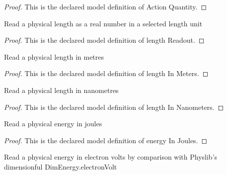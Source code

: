 \begin{proof}
  This is the declared model definition of Action Quantity.
\end{proof}
\begin{definition}
  \label{def:physics:phyx-mini-0533:phyxminiproblems-problemphyxmini0533-lengthreadout}
  Read a physical length as a real number in a selected length unit
\end{definition}
\begin{proof}
  This is the declared model definition of length Readout.
\end{proof}
\begin{definition}
  \label{def:physics:phyx-mini-0533:phyxminiproblems-problemphyxmini0533-lengthinmeters}
  Read a physical length in metres
\end{definition}
\begin{proof}
  This is the declared model definition of length In Meters.
\end{proof}
\begin{definition}
  \label{def:physics:phyx-mini-0533:phyxminiproblems-problemphyxmini0533-lengthinnanometers}
  Read a physical length in nanometres
\end{definition}
\begin{proof}
  This is the declared model definition of length In Nanometers.
\end{proof}
\begin{definition}
  \label{def:physics:phyx-mini-0533:phyxminiproblems-problemphyxmini0533-energyinjoules}
  Read a physical energy in joules
\end{definition}
\begin{proof}
  This is the declared model definition of energy In Joules.
\end{proof}
\begin{definition}
  \label{def:physics:phyx-mini-0533:phyxminiproblems-problemphyxmini0533-energyinelectronvolts}
  Read a physical energy in electron volts by comparison with Physlib's dimensionful DimEnergy.electronVolt
\end{definition}
